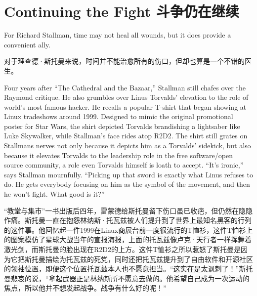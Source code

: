 

\chapter{\ifdefined\eng
Continuing the Fight
\fi
\ifdefined\chs
斗争仍在继续
\fi}

\ifdefined\eng
For Richard Stallman, time may not heal all wounds, but it does provide a convenient ally.
\fi

\ifdefined\chs
对于理查德·斯托曼来说，时间并不能治愈所有的伤口，但却也算是一个不错的医生。
\fi

\ifdefined\eng
Four years after ``The Cathedral and the Bazaar,'' Stallman still chafes over the Raymond critique. He also grumbles over Linus Torvalds' elevation to the role of world's most famous hacker. He recalls a popular T-shirt that began showing at Linux tradeshows around 1999. Designed to mimic the original promotional poster for Star Wars, the shirt depicted Torvalds brandishing a lightsaber like Luke Skywalker, while Stallman's face rides atop R2D2. The shirt still grates on Stallmans nerves not only because it depicts him as a Torvalds' sidekick, but also because it elevates Torvalds to the leadership role in the free software/open source community, a role even Torvalds himself is loath to accept. ``It's ironic,'' says Stallman mournfully. ``Picking up that sword is exactly what Linus refuses to do. He gets everybody focusing on him as the symbol of the movement, and then he won't fight. What good is it?''
\fi

\ifdefined\chs
``教堂与集市''一书出版后四年，雷蒙德给斯托曼留下伤口虽已收疤，但仍然在隐隐作痛。斯托曼一直在抱怨林纳斯·托瓦兹被人们提升到了世界上最知名黑客的行列的这件事。他回忆起一件1999在Linux商展台前一度很流行的T恤衫，这件T恤衫上的图案模仿了星球大战当年的宣报海报，上面的托瓦兹像卢克·天行者一样挥舞着激光剑，而斯托曼的脸出现在R2D2的上方。这件T恤衫之所以惹怒了斯托曼是因为它把斯托曼描绘为托瓦兹的死党，同时还把托瓦兹提升到了自由软件和开源社区的领袖位置，即便这个位置托瓦兹本人也不愿意担当。``这实在是太讽刺了！''斯托曼悲哀的说，``拿起武器正是林纳斯所不愿意去做的。他希望自己成为一次运动的焦点，所以他并不想发起战争。战争有什么好的呢！''
\fi

